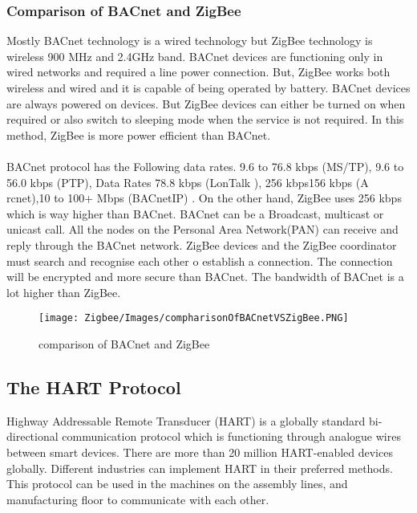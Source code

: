 \documentclass[conference]{IEEEtran}
\begin{document}
\subsubsection{Comparison of BACnet and ZigBee}
Mostly BACnet technology is a wired technology but ZigBee technology is wireless 900 MHz and 2.4GHz band. BACnet devices are functioning only in wired networks and required a line power connection. But, ZigBee works both wireless and wired and it is capable of being operated by battery. BACnet devices are always powered on devices.  But ZigBee devices can either be turned on when required or also switch to sleeping mode when the service is not required. In this method, ZigBee is more power efficient than BACnet.\\ \\
BACnet protocol has the Following data rates. 9.6 to 76.8 kbps (MS/TP), 9.6 to 56.0 kbps (PTP), Data Rates 78.8 kbps (LonTalk ), 256 kbps156 kbps (A rcnet),10 to 100+ Mbps (BACnetIP) \cite{WangJiangZhang2023}. On the other hand, ZigBee uses 256 kbps which is way higher than BACnet. BACnet can be a Broadcast, multicast or unicast call. All the nodes on the Personal Area Network(PAN) can receive and reply through the BACnet network. ZigBee devices and the ZigBee coordinator must search and recognise each other o establish a connection. The connection will be encrypted and more secure than BACnet. The bandwidth of BACnet is a lot higher than ZigBee.\cite{WangJiangZhang2023}

 \begin{figure}[htbp]
    \centering
    \texttt{[image: Zigbee/Images/compharisonOfBACnetVSZigBee.PNG]}
    \caption{comparison of BACnet and ZigBee \cite{WangJiangZhang2023}}
    \label{fig:comparisonOfBacnettoZIg }
\end{figure}

\subsection{The HART Protocol}
Highway Addressable Remote Transducer (HART) is a globally standard bi-directional communication protocol which is functioning through analogue wires between smart devices.
There are more than 20 million HART-enabled devices globally\cite{Instrumentation_Tools}. Different industries can implement HART in their preferred methods. This protocol can be used in the machines on the assembly lines, and manufacturing floor to communicate with each other\cite{Instrumentation_Tools}.
\end{document}
